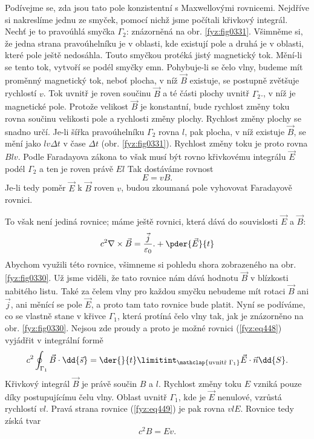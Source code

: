   Podívejme se, zda jsou tato pole konzistentní s Maxwellovými rovnicemi. Nejdříve si nakreslíme 
  jednu ze smyček, pomocí nichž jsme počítali křivkový integrál. Nechť je to pravoúhlá smyčka 
  \(\Gamma_2\): znázorněná na obr. \ref{fyz:fig0331}. Všimněme si, že jedna strana pravoúhelníku je 
  v oblasti, kde existují pole a druhá je v oblasti, které pole ještě nedosáhla. Touto smyčkou 
  protéká jistý magnetický tok. Mění-li se tento tok, vytvoří se podél smyčky emn. Pohybuje-li se 
  čelo vlny, budeme mít proměnný magnetický tok, neboť plocha, v níž \(\vec{B}\) existuje, se 
  postupně zvětšuje rychlostí \(v\). Tok uvnitř je roven součinu \(\vec{B}\) a té části plochy 
  uvnitř \(\Gamma_2\)., v níž je magnetické pole. Protože velikost \(\vec{B}\) je konstantní, bude 
  rychlost změny toku rovna součinu velikosti pole a rychlosti změny plochy. Rychlost změny plochy 
  se snadno určí. Je-li šířka pravoúhelníku \(\Gamma_2\) rovna \(l\), pak plocha, v níž existuje 
  \(\vec{B}\), se mění jako \(lv\Delta t\) v čase \(\Delta t\) (obr. \ref{fyz:fig0331}). Rychlost 
  změny toku je proto rovna \(Blv\). Podle Faradayova zákona to však musí být rovno křivkovému 
  integrálu \(\vec{E}\) podél \(\Gamma_2\) a ten je roven právě \(El\) Tak dostáváme rovnost
  \begin{equation}\label{fyz:eq447}
    E = vB.
  \end{equation}
  Je-li tedy poměr \(\vec{E}\) k \(\vec{B}\) roven \(v\), budou zkoumaná pole vyhovovat Faradayově 
  rovnici. 
  
  To však není jediná rovnice; máme ještě rovnici, která dává do souvislosti \(\vec{E}\) a 
  \(\vec{B}\):
  \begin{equation}\label{fyz:eq448}
    c^2\nabla\times\vec{B}  = \frac{\vec{j}}{\varepsilon_0}.+ \pder{\vec{E}}{t}
  \end{equation}
  Abychom využili této rovnice, všimneme si pohledu shora zobrazeného na obr. \ref{fyz:fig0330}. Už 
  jsme viděli, že tato rovnice nám dává hodnotu \(\vec{B}\) v blízkosti nabitého listu. Také za 
  čelem vlny pro každou smyčku nebudeme mít rotaci \(\vec{B}\) ani \(\vec{j}\), ani měnící se pole 
  \(\vec{E}\), a proto tam tato rovnice bude platit. Nyní se podíváme, co se vlastně stane v křivce 
  \(\Gamma_1\), která protíná čelo vlny tak, jak je znázorněno na obr. \ref{fyz:fig0330}. Nejsou zde 
  proudy a proto je možné rovnici (\ref{fyz:eq448}) vyjádřit v integrální formě
  \begin{equation}\label{fyz:eq449}
    c^2\oint_{\Gamma_1}\vec{B}\cdot\dd{\vec{s}}  = 
    \der{ }{t}\limitint_{\mathclap{\text{uvnitř }\Gamma_1}}\vec{E}\cdot\vec{n}\dd{S}.
  \end{equation}
  Křivkový integrál \(\vec{B}\) je právě součin \(B\) a \(l\). Rychlost změny toku \(E\) vzniká 
  pouze díky postupujícímu čelu vlny. Oblast uvnitř \(\Gamma_1\), kde je \(\vec{E}\) nenulové, 
  vzrůstá rychlostí \(vl\). Pravá strana rovnice (\ref{fyz:eq449}) je pak rovna \(vlE\). Rovnice 
  tedy získá tvar
  \begin{equation}\label{fyz:eq450}
    c^2B = Ev.
  \end{equation}

